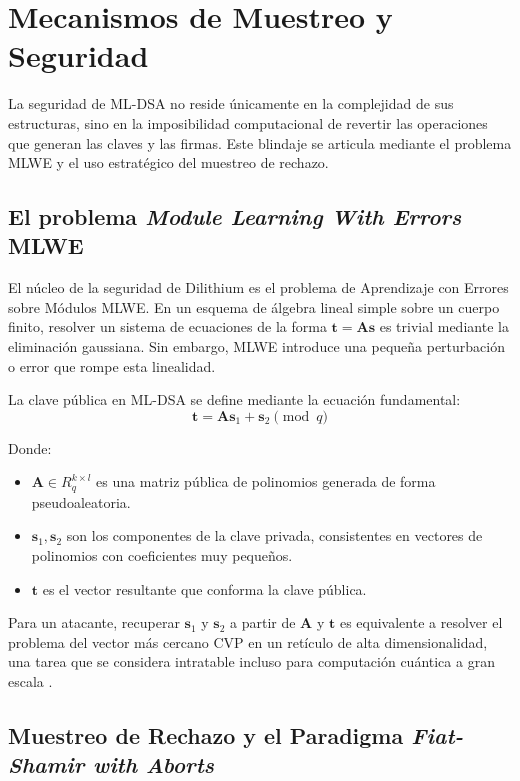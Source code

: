\documentclass[11pt, a4paper]{report}
\theoremstyle{definition}
\begin{document}
\section{Mecanismos de Muestreo y Seguridad}

La seguridad de ML-DSA no reside únicamente en la complejidad de sus estructuras, sino en la imposibilidad computacional de revertir las operaciones que generan las claves y las firmas. Este blindaje se articula mediante el problema MLWE y el uso estratégico del muestreo de rechazo.

\subsection{El problema \textit{Module Learning With Errors} MLWE}

El núcleo de la seguridad de Dilithium es el problema de Aprendizaje con Errores sobre Módulos MLWE. En un esquema de álgebra lineal simple sobre un cuerpo finito, resolver un sistema de ecuaciones de la forma $\mathbf{t} = \mathbf{A}\mathbf{s}$ es trivial mediante la eliminación gaussiana. Sin embargo, MLWE introduce una pequeña perturbación o error que rompe esta linealidad.

La clave pública en ML-DSA se define mediante la ecuación fundamental:
\begin{equation}
    \mathbf{t} = \mathbf{A}\mathbf{s}_1 + \mathbf{s}_2 \pmod q
\end{equation}

Donde:
\begin{itemize}
    \item $\mathbf{A} \in R_q^{k \times l}$ es una matriz pública de polinomios generada de forma pseudoaleatoria.
    \item $\mathbf{s}_1, \mathbf{s}_2$ son los componentes de la clave privada, consistentes en vectores de polinomios con coeficientes muy pequeños.
    \item $\mathbf{t}$ es el vector resultante que conforma la clave pública.
\end{itemize}

Para un atacante, recuperar $\mathbf{s}_1$ y $\mathbf{s}_2$ a partir de $\mathbf{A}$ y $\mathbf{t}$ es equivalente a resolver el problema del vector más cercano CVP en un retículo de alta dimensionalidad, una tarea que se considera intratable incluso para computación cuántica a gran escala \cite{nist_fips204}.

\subsection{Muestreo de Rechazo y el Paradigma \textit{Fiat-Shamir with Aborts}}
\end{document}
